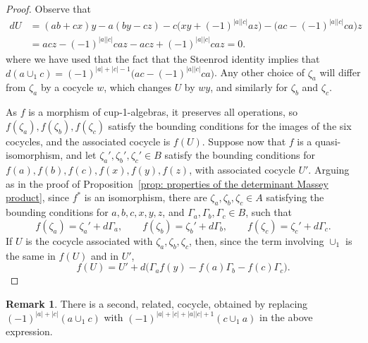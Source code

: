 \documentclass[11pt]{article}
\theoremstyle{definition}
\theoremstyle{definition}
\newtheorem{remark}[theorem]{Remark}
\begin{document}
\begin{proof}
 Observe that
\begin{align*} 
dU &= (ab+cx)y-a(by-cz)-c\bigl(xy+(-1)^{|a||c|}az\bigr) -\bigl(ac-(-1)^{|a||c|}ca\bigr)z 
\\ 
 &=acz-(-1)^{|a||c|}caz-acz+(-1)^{|a||c|}caz=0. 
\end{align*}
where we have used that the fact that the Steenrod identity implies that
$d(a\cup_1c)=(-1)^{|a|+|c|-1}\bigl(ac-(-1)^{|a||c|}ca\bigr)$.
Any other choice of $\zeta_a$ will differ from $\zeta_a$ by a cocycle $w$, 
which changes $U$ by $wy$, and similarly for $\zeta_b$ and $\zeta_c$.

As $f$ is a morphism of cup-1-algebras, it preserves all operations, 
so $f(\zeta_a),f(\zeta_b),f(\zeta_c)$ satisfy the bounding conditions for the images of the six cocycles,
and the associated cocycle is $f(U)$.
Suppose now that $f$ is a quasi-isomorphism, and let $\zeta_a',\zeta_b',\zeta_c'\in B$ satisfy 
the bounding conditions for $f(a),f(b),f(c),f(x),f(y),f(z)$, with associated cocycle $U'$.
Arguing as in the proof of Proposition~\ref{prop: properties of the determinant Massey product}, 
since $f^*$ is an isomorphism, there are $\zeta_a,\zeta_b,\zeta_c\in A$ satisfying the bounding conditions 
for $a,b,c,x,y,z$, and $\Gamma_a,\Gamma_b,\Gamma_c\in B$, such that
\begin{equation*}
f(\zeta_a)=\zeta_a'+d\Gamma_a, \qquad f(\zeta_b)=\zeta_b'+d\Gamma_b, \qquad f(\zeta_c)=\zeta_c'+d\Gamma_c.
\end{equation*}
If $U$ is the cocycle associated with $\zeta_a,\zeta_b,\zeta_c$, then, 
since the term involving $\cup_1$ is the same in $f(U)$ and in $U'$,
\begin{equation*}
f(U)=U'+d\bigl(\Gamma_a f(y)-f(a)\Gamma_b-f(c)\Gamma_c\bigr).
\end{equation*}
\end{proof} 



\begin{remark}
There is a second, related, cocycle, obtained by replacing
$(-1)^{|a|+|c|}\left(a\cup_1 c\right)$ with $(-1)^{|a|+|c|+|a||c|+1}\left(c\cup_1 a\right)$ in the above expression. 
\end{remark}
\end{document}
